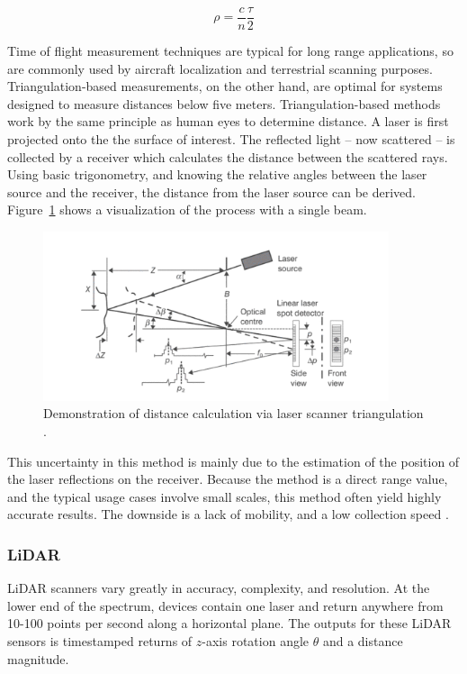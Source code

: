 \documentclass[12pt]{drexelthesis}
\let\Oldsubsubsection\subsubsection
\renewcommand{\subsubsection}{\FloatBarrier\Oldsubsubsection}
\begin{document}
\begin{equation}
	\rho = \frac{c}{n} \frac{\tau}{2}
\end{equation}

Time of flight measurement techniques are typical for long range applications, so are commonly used by aircraft localization and terrestrial scanning purposes. Triangulation-based measurements, on the other hand, are optimal for systems designed to measure distances below five meters. Triangulation-based methods work by the same principle as human eyes to determine distance.   A laser is first projected onto the the surface of interest. The reflected light -- now scattered -- is collected by a receiver which calculates the distance between the scattered rays. Using basic trigonometry, and knowing the relative angles between the laser source and the receiver, the distance from the laser source can be derived. Figure~\ref{laser:triangulation} shows a visualization of the process with a single beam.

\begin{figure}
	\centering
		\includegraphics[width=4in]{instruments/laser-scanner-triangulation.png}
		\caption[Demonstration of distance calculation via laser scanner triangulation]{Demonstration of distance calculation via laser scanner triangulation 
		\cite{basic-measurement-principles}. }
		\label{laser:triangulation}
\end{figure}

This uncertainty in this method is mainly due to the estimation of the position of the laser reflections on the receiver. Because the method is a direct range value, and the typical usage cases involve small scales, this method often yield highly accurate results. The downside is a lack of mobility, and a low collection speed \cite{basic-measurement-principles}.




\subsubsection{LiDAR}
LiDAR scanners vary greatly in accuracy, complexity, and resolution. At the lower end of the spectrum, devices contain one laser and return anywhere from 10-100 points per second along a horizontal plane. The outputs for these LiDAR sensors is timestamped returns of $z$-axis rotation angle $\theta$ and a distance magnitude.
\end{document}
